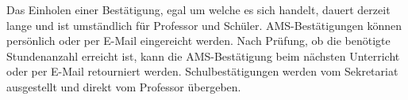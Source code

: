 Das Einholen einer Bestätigung, egal um welche es sich handelt, dauert derzeit lange und ist umständlich für Professor und Schüler. 
AMS-Bestätigungen können persönlich oder per E-Mail eingereicht werden. 
Nach Prüfung, ob die benötigte Stundenanzahl erreicht ist, kann die AMS-Bestätigung beim nächsten Unterricht oder per E-Mail retourniert werden. 
Schulbestätigungen werden vom Sekretariat ausgestellt und direkt vom Professor übergeben. 